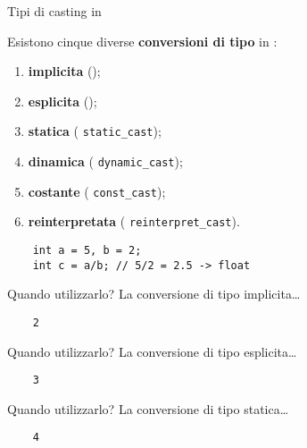 \documentclass[xcolor={dvipsnames, svgnames, x11names, table}, 10pt]{beamer}
\begin{document}
\begin{frame}[t, fragile]{Tipi di casting in \cplusplus}

    Esistono cinque diverse \alert<1->{\textbf{conversioni di tipo}} in \cplusplus:

    \begin{enumerate}[<+- | alert@+>]
        \item \textbf{implicita} ();
        \item \textbf{esplicita} ();
        \item \textbf{statica} ( \texttt{static\_cast});
        \item \textbf{dinamica} ( \texttt{dynamic\_cast});
        \item \textbf{costante} ( \texttt{const\_cast});
        \item \textbf{reinterpretata} ( \texttt{reinterpret\_cast}).
    \end{enumerate}
    
    \begin{overprint}
    \begin{verbatim}
    int a = 5, b = 2;
    int c = a/b; // 5/2 = 2.5 -> float
    \end{verbatim}
    
    \begin{block}{Quando utilizzarlo?}
    La conversione di tipo implicita\dots
    \end{block}
    
    \begin{verbatim}
    2
    \end{verbatim}
        
    \begin{block}{Quando utilizzarlo?}
    La conversione di tipo esplicita\dots
    \end{block}
    
    \begin{verbatim}
    3
    \end{verbatim}
    
    \begin{block}{Quando utilizzarlo?}
    La conversione di tipo statica\dots
    \end{block}
    
    \begin{verbatim}
    4
    \end{verbatim}
        

\end{overprint}
\end{frame}
\end{document}
